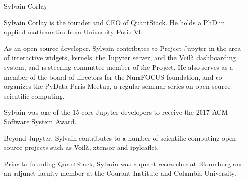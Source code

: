 \begin{participant}[type=leadPI,PM=6,gender=male]{Sylvain Corlay}

  Sylvain Corlay is the founder and CEO of QuantStack. He holds a PhD in applied mathematics from University Paris VI.

  As an open source developer, Sylvain contributes to Project Jupyter in the area of interactive widgets, kernels, the Jupyter server, and the Voilà dashboarding system, and is steering committee member of the Project. He also serves as a member of the board of directors for the NumFOCUS foundation, and co-organizes the PyData Paris Meetup, a regular seminar series on open-source scientific computing.

  Sylvain was one of the 15 core Jupyter developers to receive the 2017 ACM Software System Award.

  Beyond Jupyter, Sylvain contributes to a number of scientific computing open-source projects such as Voilà, xtensor and ipyleaflet.

  Prior to founding QuantStack, Sylvain was a quant researcher at Bloomberg and an adjunct faculty member at the Courant Institute and Columbia University.
\end{participant}


